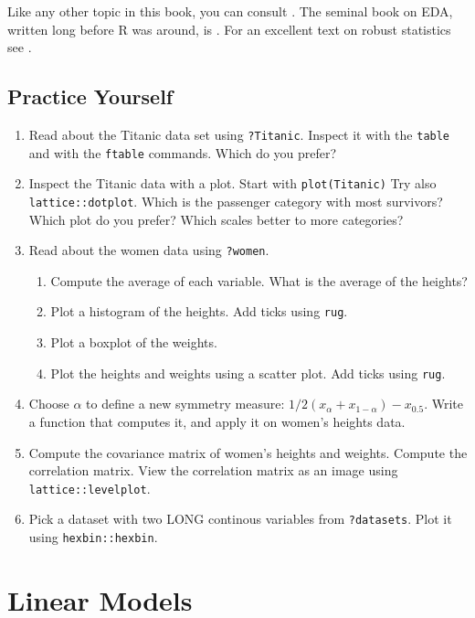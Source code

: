 \documentclass[]{book}
\providecommand{\tightlist}{%
  \setlength{\itemsep}{0pt}\setlength{\parskip}{0pt}}
\theoremstyle{definition}
\theoremstyle{definition}
\theoremstyle{definition}
\theoremstyle{remark}
\begin{document}
Like any other topic in this book, you can consult
\citet{venables2013modern}. The seminal book on EDA, written long before
R was around, is \citet{tukey1977exploratory}. For an excellent text on
robust statistics see \citet{wilcox2011introduction}.

\section{Practice Yourself}\label{practice-yourself-2}

\begin{enumerate}
\def\labelenumi{\arabic{enumi}.}
\item
  Read about the Titanic data set using \texttt{?Titanic}. Inspect it
  with the \texttt{table} and with the \texttt{ftable} commands. Which
  do you prefer?
\item
  Inspect the Titanic data with a plot. Start with
  \texttt{plot(Titanic)} Try also \texttt{lattice::dotplot}. Which is
  the passenger category with most survivors? Which plot do you prefer?
  Which scales better to more categories?
\item
  Read about the women data using \texttt{?women}.

  \begin{enumerate}
  \def\labelenumii{\arabic{enumii}.}
  \tightlist
  \item
    Compute the average of each variable. What is the average of the
    heights?
  \item
    Plot a histogram of the heights. Add ticks using \texttt{rug}.
  \item
    Plot a boxplot of the weights.
  \item
    Plot the heights and weights using a scatter plot. Add ticks using
    \texttt{rug}.
  \end{enumerate}
\item
  Choose \(\alpha\) to define a new symmetry measure:
  \(1/2(x_\alpha+x_{1-\alpha})-x_{0.5}\). Write a function that computes
  it, and apply it on women's heights data.
\item
  Compute the covariance matrix of women's heights and weights. Compute
  the correlation matrix. View the correlation matrix as an image using
  \texttt{lattice::levelplot}.
\item
  Pick a dataset with two LONG continous variables from
  \texttt{?datasets}. Plot it using \texttt{hexbin::hexbin}.
\end{enumerate}

\chapter{Linear Models}\label{lm}
\end{document}
